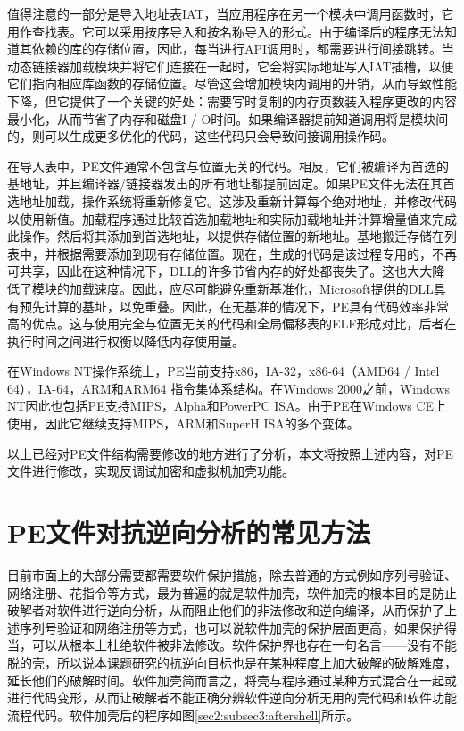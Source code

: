 值得注意的一部分是导入地址表IAT，当应用程序在另一个模块中调用函数时，它用作查找表。它可以采用按序导入和按名称导入的形式。由于编译后的程序无法知道其依赖的库的存储位置，因此，每当进行API调用时，都需要进行间接跳转。当动态链接器加载模块并将它们连接在一起时，它会将实际地址写入IAT插槽，以便它们指向相应库函数的存储位置。尽管这会增加模块内调用的开销，从而导致性能下降，但它提供了一个关键的好处：需要写时复制的内存页数装入程序更改的内容最小化，从而节省了内存和磁盘I / O时间。如果编译器提前知道调用将是模块间的，则可以生成更多优化的代码，这些代码只会导致间接调用操作码。

%
在导入表中，PE文件通常不包含与位置无关的代码。相反，它们被编译为首选的基地址，并且编译器/链接器发出的所有地址都提前固定。如果PE文件无法在其首选地址加载，操作系统将重新修复它。这涉及重新计算每个绝对地址，并修改代码以使用新值。加载程序通过比较首选加载地址和实际加载地址并计算增量值来完成此操作。然后将其添加到首选地址，以提供存储位置的新地址。基地搬迁存储在列表中，并根据需要添加到现有存储位置。现在，生成的代码是该过程专用的，不再可共享，因此在这种情况下，DLL的许多节省内存的好处都丧失了。这也大大降低了模块的加载速度。因此，应尽可能避免重新基准化，Microsoft提供的DLL具有预先计算的基址，以免重叠。因此，在无基准的情况下，PE具有代码效率非常高的优点。这与使用完全与位置无关的代码和全局偏移表的ELF形成对比，后者在执行时间之间进行权衡以降低内存使用量。

在Windows NT操作系统上，PE当前支持x86，IA-32，x86-64（AMD64 / Intel 64），IA-64，ARM和ARM64 指令集体系结构。在Windows 2000之前，Windows NT因此也包括PE支持MIPS，Alpha和PowerPC ISA。由于PE在Windows CE上使用，因此它继续支持MIPS，ARM和SuperH ISA的多个变体。

以上已经对PE文件结构需要修改的地方进行了分析，本文将按照上述内容，对PE文件进行修改，实现反调试加密和虚拟机加壳功能。
\section{PE文件对抗逆向分析的常见方法}

目前市面上的大部分需要都需要软件保护措施，除去普通的方式例如序列号验证、网络注册、花指令等方式，最为普遍的就是软件加壳，软件加壳的根本目的是防止破解者对软件进行逆向分析，从而阻止他们的非法修改和逆向编译，从而保护了上述序列号验证和网络注册等方式，也可以说软件加壳的保护层面更高，如果保护得当，可以从根本上杜绝软件被非法修改。软件保护界也存在一句名言——没有不能脱的壳，所以说本课题研究的抗逆向目标也是在某种程度上加大破解的破解难度，延长他们的破解时间。软件加壳简而言之，将壳与程序通过某种方式混合在一起或进行代码变形，从而让破解者不能正确分辨软件逆向分析无用的壳代码和软件功能流程代码。软件加壳后的程序如图\ref{sec2:subsec3:aftershell}所示。

